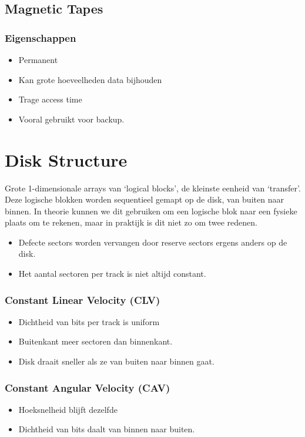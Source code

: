 \documentclass[12pt]{article}
\begin{document}
\subsection{Magnetic Tapes}
\subsubsection{Eigenschappen}
\begin{itemize}
	\item Permanent
	\item Kan grote hoeveelheden data bijhouden
	\item Trage access time
	\item Vooral gebruikt voor backup.
\end{itemize}
\section{Disk Structure}
Grote 1-dimensionale arrays van `logical blocks', de kleinste eenheid van `transfer'. Deze logische blokken worden sequentieel gemapt op de disk, van buiten naar binnen. In theorie kunnen we dit gebruiken om een logische blok naar een fysieke plaats om te rekenen, maar in praktijk is dit niet zo om twee redenen.
\begin{itemize}
	\item Defecte sectors worden vervangen door reserve sectors ergens anders op de disk.
	\item Het aantal sectoren per track is niet altijd constant.
\end{itemize}
\subsubsection{Constant Linear Velocity (CLV)}
\begin{itemize}
	\item Dichtheid van bits per track is uniform
	\item Buitenkant meer sectoren dan binnenkant.
	\item Disk draait sneller als ze van buiten naar binnen gaat.
\end{itemize}
\subsubsection{Constant Angular Velocity (CAV)}
\begin{itemize}
	\item Hoeksnelheid blijft dezelfde
	\item Dichtheid van bits daalt van binnen naar buiten.
\end{itemize}
\end{document}
